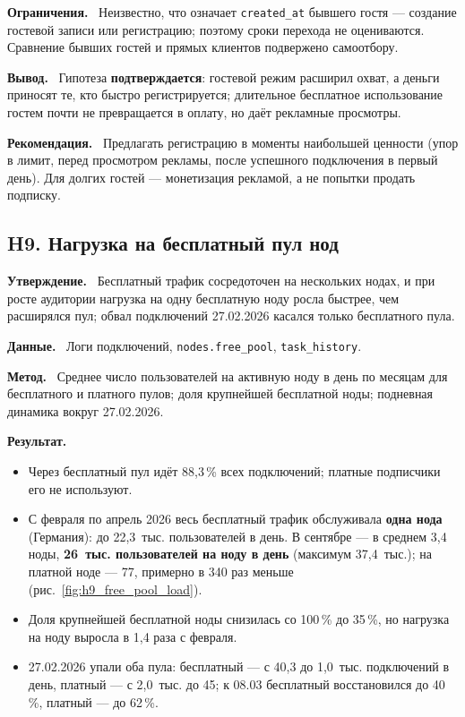 \documentclass[11pt,a4paper]{article}
\newcommand{\hblock}[1]{\par\smallskip\noindent\textbf{#1.}~}
\begin{document}
\hblock{Ограничения} Неизвестно, что означает \texttt{created\_at} бывшего гостя --- создание гостевой записи или регистрацию; поэтому сроки перехода не оцениваются. Сравнение бывших гостей и прямых клиентов подвержено самоотбору.

\hblock{Вывод} Гипотеза \textbf{подтверждается}: гостевой режим расширил охват, а деньги приносят те, кто быстро регистрируется; длительное бесплатное использование гостем почти не превращается в оплату, но даёт рекламные просмотры.

\hblock{Рекомендация} Предлагать регистрацию в моменты наибольшей ценности (упор в лимит, перед просмотром рекламы, после успешного подключения в первый день). Для долгих гостей --- монетизация рекламой, а не попытки продать подписку.

\subsection{H9. Нагрузка на бесплатный пул нод}

\hblock{Утверждение} Бесплатный трафик сосредоточен на нескольких нодах, и при росте аудитории нагрузка на одну бесплатную ноду росла быстрее, чем расширялся пул; обвал подключений 27.02.2026 касался только бесплатного пула.

\hblock{Данные} Логи подключений, \texttt{nodes.free\_pool}, \texttt{task\_history}.

\hblock{Метод} Среднее число пользователей на активную ноду в день по месяцам для бесплатного и платного пулов; доля крупнейшей бесплатной ноды; подневная динамика вокруг 27.02.2026.

\hblock{Результат}
\begin{itemize}
  \item Через бесплатный пул идёт 88,3\,\% всех подключений; платные подписчики его не используют.
  \item С февраля по апрель 2026 весь бесплатный трафик обслуживала \textbf{одна нода} (Германия): до 22,3~тыс. пользователей в день. В сентябре --- в среднем 3,4 ноды, \textbf{26~тыс. пользователей на ноду в день} (максимум 37,4~тыс.); на платной ноде --- 77, примерно в 340 раз меньше (рис.~\ref{fig:h9_free_pool_load}).
  \item Доля крупнейшей бесплатной ноды снизилась со 100\,\% до 35\,\%, но нагрузка на ноду выросла в 1,4 раза с февраля.
  \item 27.02.2026 упали оба пула: бесплатный --- с 40,3 до 1,0~тыс. подключений в день, платный --- с 2,0~тыс. до 45; к 08.03 бесплатный восстановился до 40\,\%, платный --- до 62\,\%.
\end{itemize}
\end{document}
